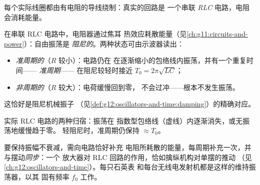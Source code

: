 每个实际线圈都由有电阻的导线绕制：真实的回路是
一个串联 \emph{RLC} 电路，电阻会消耗能量。

\begin{definition}[准周期与非周期状态]\label{def:g12:rlc-oscillations:regimes}
在串联 RLC 电路中，电阻器通过焦耳
热效应耗散能量（见\cref{ch:g11:circuits-and-power}）：自由振荡是
\emph{阻尼的}。两种状态可由示波器读出：
\begin{itemize}
  \item \emph{准周期的}（$R$ 较小）：电路仍在
        在逐渐缩小的包络线内振荡，并有一个重复时间——
        \emph{准周期}——
        在阻尼较轻时接近 $T_0 = 2\pi\sqrt{LC}$；
  \item \emph{非周期的}（$R$ 较大）：电荷缓慢回到零，
        不会过冲——根本不发生振荡。
\end{itemize}
这恰好是阻尼机械振子
（见\cref{def:g12:oscillators-and-time:damping}）的精确对应。
\end{definition}

\begin{omfigure}

{\small 实际 RLC 电路的两种归宿：振荡在
指数型包络线（虚线）内逐渐消失，或无振荡地缓慢趋于零。
轻阻尼时，准周期仍保持 $\approx T_0$。}
\end{omfigure}

\begin{remark}[维持振荡]\label{rem:g12:rlc-oscillations:maintain}
要保持振幅不衰减，需向电路恰好补充
电阻所耗散的能量，每周期补充一次，并与摆动\emph{同步}：一个
放大器对 RLC 回路的作用，恰如擒纵机构对单摆的推动
（见\cref{ch:g12:oscillators-and-time}）。每只石英表
和每台无线电发射机都是这样的维持振荡器，以其
固有频率 $f_0$ 工作。
\end{remark}

